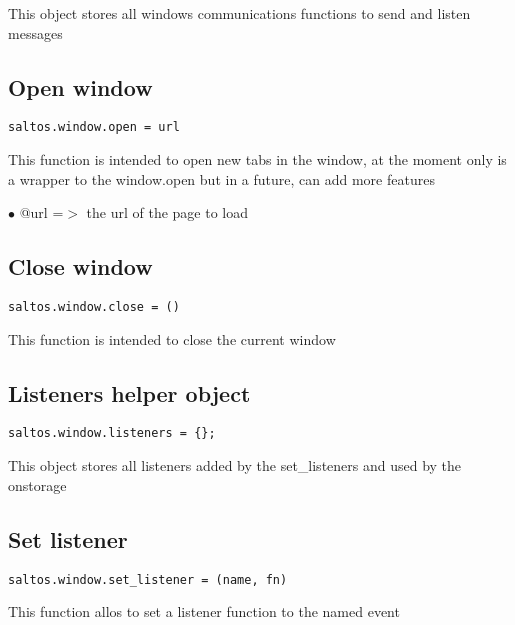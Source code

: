 \documentclass[a4paper]{book}
\begin{document}
This object stores all windows communications functions to send and listen messages

\hypertarget{toc444}{}
\subsection{Open window}

\begin{lstlisting}
saltos.window.open = url
\end{lstlisting}

This function is intended to open new tabs in the window, at the moment only is a wrapper to
the window.open but in a future, can add more features

\begin{compactitem}
\item[\color{myblue}$\bullet$] @url =$>$ the url of the page to load
\end{compactitem}

\hypertarget{toc445}{}
\subsection{Close window}

\begin{lstlisting}
saltos.window.close = ()
\end{lstlisting}

This function is intended to close the current window

\hypertarget{toc446}{}
\subsection{Listeners helper object}

\begin{lstlisting}
saltos.window.listeners = {};
\end{lstlisting}

This object stores all listeners added by the set\_listeners and used by the onstorage

\hypertarget{toc447}{}
\subsection{Set listener}

\begin{lstlisting}
saltos.window.set_listener = (name, fn)
\end{lstlisting}

This function allos to set a listener function to the named event
\end{document}
